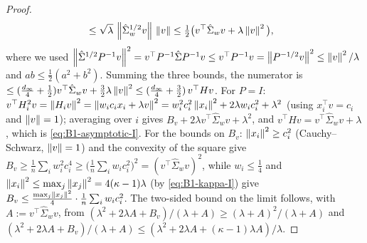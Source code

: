 \begin{proof}
\begin{align*}
&\le\sqrt\lambda\,\left\|\hat\Sigma_w^{1/2}v\right\|\,\left\|v\right\|\le\tfrac12\big(v^\top\hat\Sigma_wv+\lambda\left\|v\right\|^2\big),
\end{align*}
where we used $\left\|\hat\Sigma^{1/2}P^{-1}v\right\|^2=v^\top P^{-1}\hat\Sigma P^{-1}v\le v^\top P^{-1}v=\left\|P^{-1/2}v\right\|^2\le\left\|v\right\|^2/\lambda$
and $ab\le\frac12(a^2+b^2)$. Summing the three bounds, the numerator is
$\le(\frac{d_\infty}4+\frac12)v^\top\hat\Sigma_wv+\frac32\lambda\left\|v\right\|^2\le(\frac{d_\infty}4+\frac32)\,v^\top Hv$.
For $P=I$: $v^\top H_i^2v=\left\|H_iv\right\|^2=\left\|w_ic_ix_i+\lambda v\right\|^2=w_i^2c_i^2\left\|x_i\right\|^2+2\lambda w_ic_i^2+\lambda^2$
(using $x_i^\top v=c_i$ and $\left\|v\right\|=1$); averaging over $i$ gives $B_v+2\lambda v^\top\hat\Sigma_wv+\lambda^2$,
and $v^\top Hv=v^\top\hat\Sigma_wv+\lambda$, which is \eqref{eq:B1-asymptotic-I}. For the bounds on $B_v$:
$\left\|x_i\right\|^2\ge c_i^2$ (Cauchy--Schwarz, $\left\|v\right\|=1$) and the convexity of the square give
$B_v\ge\frac1n\sum_iw_i^2c_i^4\ge\big(\frac1n\sum_iw_ic_i^2\big)^2=(v^\top\hat\Sigma_wv)^2$, while
$w_i\le\frac14$ and $\left\|x_i\right\|^2\le\max_j\left\|x_j\right\|^2=4(\kappa-1)\lambda$ (by \eqref{eq:B1-kappa-I}) give
$B_v\le\frac{\max_j\left\|x_j\right\|^2}4\cdot\frac1n\sum_iw_ic_i^2$. The two-sided bound on the limit follows, with
$A:=v^\top\hat\Sigma_wv$, from $(\lambda^2+2\lambda A+B_v)/(\lambda+A)\ge(\lambda+A)^2/(\lambda+A)$ and
$(\lambda^2+2\lambda A+B_v)/(\lambda+A)\le(\lambda^2+2\lambda A+(\kappa-1)\lambda A)/\lambda$.
\end{proof}

